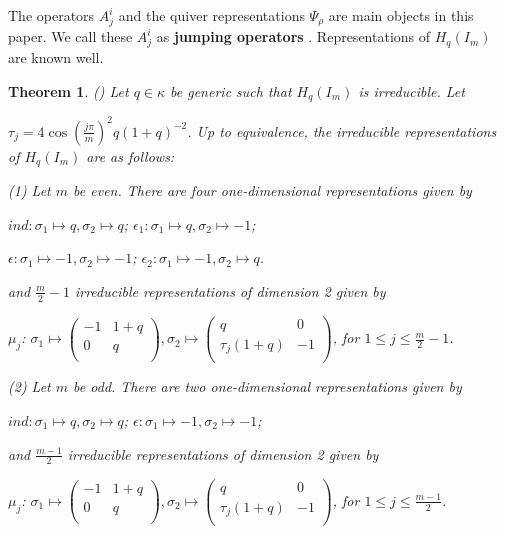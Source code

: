 \def\CTEXPreproc{Created by ctex v0.2.12, don't edit!}\documentclass[11pt]{article}
\newtheorem{thm}{Theorem}[section]
\begin{document}
The operators $A^i _j$ and the quiver representations $\Psi_{\rho}$ are main objects in this paper.  We call these $A^i _j$ as \textbf{jumping operators }. Representations of $H_q (I_m )$ are known well.

\begin{thm} (\cite{GP}) Let $q\in \kappa$ be generic such that $H_q (I_m )$ is irreducible. Let

$\tau_j = 4\cos (\frac{j \pi}{m}  )^2 q (1+q )^{-2}$. Up to equivalence, the irreducible representations of $H_{q} (I_m)$ are as follows:

\noindent(1) Let $m$ be even.   There are four one-dimensional representations given by

$ind: \sigma_1 \mapsto q , \sigma_2 \mapsto q $;        $\epsilon_1 : \sigma_1 \mapsto q , \sigma_2 \mapsto -1 $;

$\epsilon: \sigma_1 \mapsto -1 , \sigma_2 \mapsto -1 $;  $\epsilon_2 : \sigma_1 \mapsto -1 ,\sigma_2 \mapsto q $.

and $\frac{m}{2}-1$ irreducible representations  of dimension 2 given by

$\mu_j $: $\sigma_1 \mapsto \left(
                    \begin{array}{cc}
                      -1 &  1+q \\
                      0 & q \\
                    \end{array}
                  \right)
,  \sigma_2 \mapsto \left(
                      \begin{array}{cc}
                        q & 0 \\
                        \tau_j (1+q ) & -1 \\
                      \end{array}
                    \right)
 $, for $1\leq j\leq \frac{m}{2}-1$.

\noindent(2) Let $m$ be odd.   There are two one-dimensional representations given by

$ind: \sigma_1 \mapsto q , \sigma_2 \mapsto q $;        $\epsilon: \sigma_1 \mapsto -1 , \sigma_2 \mapsto -1 $;

and $\frac{m-1}{2}$ irreducible representations  of dimension 2 given by

$\mu_j $: $\sigma_1 \mapsto \left(
                    \begin{array}{cc}
                      -1 &  1+q \\
                      0 & q \\
                    \end{array}
                  \right)
,  \sigma_2 \mapsto \left(
                      \begin{array}{cc}
                        q & 0 \\
                        \tau_j (1+q ) & -1 \\
                      \end{array}
                    \right)
 $, for $1\leq j\leq \frac{m-1}{2}$.


\end{thm}
\end{document}
